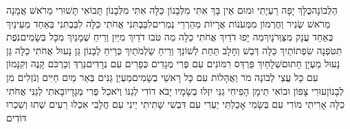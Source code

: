 \documentclass[../main/main.tex]{subfiles}
\begin{document}
\begin{multicols*}{\ncols}
הַלְּבוֹנָה\PreVerseSpace{}כֻּלָּךְ יָפָה רַעְיָתִי וּמוּם אֵין בָּךְ \ClosedSection{}אִתִּי מִלְּבָנוֹן כַּלָּה אִתִּי מִלְּבָנוֹן תָּבוֹאִי תָּשׁוּרִי מֵרֹאשׁ אֲמָנָה מֵרֹאשׁ שְׂנִיר וְחֶרְמוֹן מִמְּעֹנוֹת אֲרָיוֹת מֵהַרְרֵי נְמֵרִים\PreVerseSpace{}לִבַּבְתִּנִי אֲחֹתִי כַלָּה לִבַּבְתִּנִי בְּאַחַד מֵעֵינַיִךְ בְּאַחַד עֲנָק מִצַּוְּרֹנָיִךְ\PreVerseSpace{}מַה יָּפוּ דֹדַיִךְ אֲחֹתִי כַלָּה מַה טֹּבוּ דֹדַיִךְ מִיַּיִן וְרֵיחַ שְׁמָנַיִךְ מִכָּל בְּשָׂמִים\PreVerseSpace{}נֹפֶת תִּטֹּפְנָה שִׂפְתוֹתַיִךְ כַּלָּה דְּבַשׁ וְחָלָב תַּחַת לְשׁוֹנֵךְ וְרֵיחַ שַׂלְמֹתַיִךְ כְּרֵיחַ לְבָנוֹן \ClosedSection{}גַּן נָעוּל אֲחֹתִי כַלָּה גַּן\SubEnd{} נָעוּל מַעְיָן חָתוּם\PreVerseSpace{}שְׁלָחַיִךְ פַּרְדֵּס רִמּוֹנִים עִם פְּרִי מְגָדִים כְּפָרִים עִם נְרָדִים\PreVerseSpace{}נֵרְדְּ וְכַרְכֹּם קָנֶה וְקִנָּמוֹן עִם כָּל עֲצֵי לְבוֹנָה מֹר וַאֲהָלוֹת עִם כָּל רָאשֵׁי בְשָׂמִים\PreVerseSpace{}מַעְיַן גַּנִּים בְּאֵר מַיִם חַיִּים וְנֹזְלִים מִן לְבָנוֹן\PreVerseSpace{}עוּרִי צָפוֹן וּבוֹאִי תֵימָן הָפִיחִי גַנִּי יִזְּלוּ בְשָׂמָיו יָבֹא דוֹדִי לְגַנּוֹ וְיֹאכַל פְּרִי מְגָדָיו\PreChapterSpace{}בָּאתִי לְגַנִּי אֲחֹתִי כַלָּה אָרִיתִי מוֹרִי עִם בְּשָׂמִי אָכַלְתִּי יַעְרִי עִם דִּבְשִׁי שָׁתִיתִי יֵינִי עִם חֲלָבִי אִכְלוּ רֵעִים שְׁתוּ וְשִׁכְרוּ דּוֹדִים\OpenSection{}\par

\end{multicols*}
\end{document}
